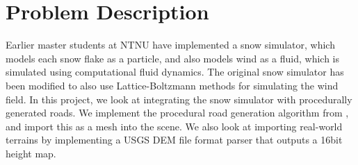\chapter*{Problem Description}
Earlier master students at NTNU have implemented a snow simulator, which models each snow flake as a particle, and also models wind as a fluid, which is simulated using computational fluid dynamics. The original snow simulator has been modified to also use Lattice-Boltzmann methods for simulating the wind field. In this project, we look at integrating the snow simulator with procedurally generated roads. We implement the procedural road generation algorithm from \cite{roadgen}, and import this as a mesh into the scene. We also look at importing real-world terrains by implementing a USGS DEM file format parser that outputs a 16bit height map.
